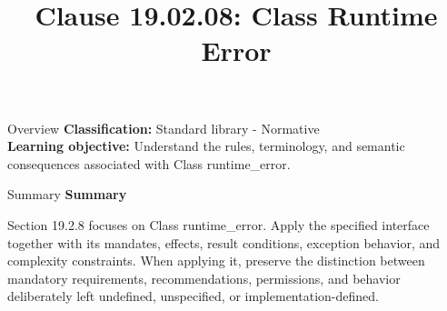 \documentclass[10pt,letterpaper]{article}
\title{Clause 19.02.08: Class Runtime Error}
\author{}
\date{}
\begin{document}
\maketitle
\begin{CornellOverviewBox}{Overview}
\textbf{Classification:} Standard library - Normative\\[2pt]
\textbf{Learning objective:} Understand the rules, terminology, and semantic consequences associated with Class runtime\_error.
\end{CornellOverviewBox}\begin{CornellSummaryBox}{Summary}
{\sffamily\bfseries\color{Accent} Summary}\par\vspace{3pt}Section 19.2.8 focuses on Class runtime\_error. Apply the specified interface together with its mandates, effects, result conditions, exception behavior, and complexity constraints. When applying it, preserve the distinction between mandatory requirements, recommendations, permissions, and behavior deliberately left undefined, unspecified, or implementation-defined.
\end{CornellSummaryBox}
\end{document}
